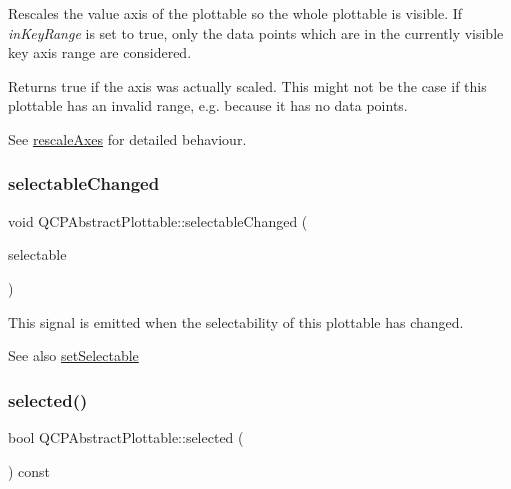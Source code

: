 Rescales the value axis of the plottable so the whole plottable is visible. If {\itshape in\+Key\+Range} is set to true, only the data points which are in the currently visible key axis range are considered.

Returns true if the axis was actually scaled. This might not be the case if this plottable has an invalid range, e.\+g. because it has no data points.

See \hyperlink{class_q_c_p_abstract_plottable_a1491c4a606bccd2d09e65e11b79eb882}{rescale\+Axes} for detailed behaviour. \mbox{\label{class_q_c_p_abstract_plottable_a663b1a44123c8340ac041a29d1e2c973}} 
\subsubsection{\texorpdfstring{selectable\+Changed}{selectableChanged}}
{\footnotesize\ttfamily void Q\+C\+P\+Abstract\+Plottable\+::selectable\+Changed (\begin{DoxyParamCaption}\item[{\hyperlink{namespace_q_c_p_ac6cb9db26a564b27feda362a438db038}{Q\+C\+P\+::\+Selection\+Type}}]{selectable }\end{DoxyParamCaption})\hspace{0.3cm}{\ttfamily [signal]}}

This signal is emitted when the selectability of this plottable has changed.

\begin{DoxySeeAlso}{See also}
\hyperlink{class_q_c_p_abstract_plottable_ac238d6e910f976f1f30d41c2bca44ac3}{set\+Selectable} 
\end{DoxySeeAlso}
\mbox{\label{class_q_c_p_abstract_plottable_a0b3b514474fe93354fc74cfc144184b4}} 
\subsubsection{\texorpdfstring{selected()}{selected()}}
{\footnotesize\ttfamily bool Q\+C\+P\+Abstract\+Plottable\+::selected (\begin{DoxyParamCaption}{ }\end{DoxyParamCaption}) const\hspace{0.3cm}{\ttfamily [inline]}}


